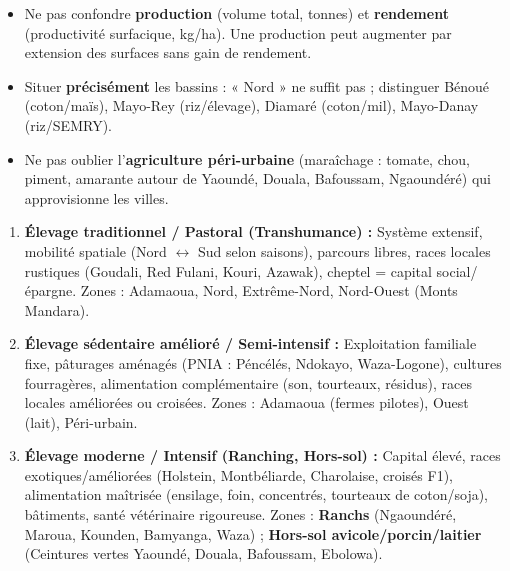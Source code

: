\documentclass[11pt]{article}
\newcounter{popsec}
\newcounter{popsub}
\newcommand{\courssub}[1]{%
  \stepcounter{popsub}%
  \par\vspace{9pt}\noindent{\popxbold\fontsize{11.5}{13}\selectfont\color{popink}{\color{poporange}\thepopsec.\thepopsub}\hspace{6pt}#1}\par\nopagebreak\vspace{4pt}
}
\begin{document}
\begin{attention}
\begin{itemize}
    \item Ne pas confondre \textbf{production} (volume total, tonnes) et \textbf{rendement} (productivité surfacique, kg/ha). Une production peut augmenter par extension des surfaces sans gain de rendement.
    \item Situer \textbf{précisément} les bassins : « Nord » ne suffit pas ; distinguer Bénoué (coton/maïs), Mayo-Rey (riz/élevage), Diamaré (coton/mil), Mayo-Danay (riz/SEMRY).
    \item Ne pas oublier l'\textbf{agriculture péri-urbaine} (maraîchage : tomate, chou, piment, amarante autour de Yaoundé, Douala, Bafoussam, Ngaoundéré) qui approvisionne les villes.
\end{itemize}
\end{attention}

\courssub{L'élevage au Cameroun}

\begin{definition}
\begin{enumerate}
    \item \textbf{Élevage traditionnel / Pastoral (Transhumance) :} Système extensif, mobilité spatiale (Nord $\leftrightarrow$ Sud selon saisons), parcours libres, races locales rustiques (Goudali, Red Fulani, Kouri, Azawak), cheptel = capital social/épargne. Zones : Adamaoua, Nord, Extrême-Nord, Nord-Ouest (Monts Mandara).
    \item \textbf{Élevage sédentaire amélioré / Semi-intensif :} Exploitation familiale fixe, pâturages aménagés (PNIA : Péncélés, Ndokayo, Waza-Logone), cultures fourragères, alimentation complémentaire (son, tourteaux, résidus), races locales améliorées ou croisées. Zones : Adamaoua (fermes pilotes), Ouest (lait), Péri-urbain.
    \item \textbf{Élevage moderne / Intensif (Ranching, Hors-sol) :} Capital élevé, races exotiques/améliorées (Holstein, Montbéliarde, Charolaise, croisés F1), alimentation maîtrisée (ensilage, foin, concentrés, tourteaux de coton/soja), bâtiments, santé vétérinaire rigoureuse. Zones : \textbf{Ranchs} (Ngaoundéré, Maroua, Kounden, Bamyanga, Waza) ; \textbf{Hors-sol avicole/porcin/laitier} (Ceintures vertes Yaoundé, Douala, Bafoussam, Ebolowa).
\end{enumerate}
\end{definition}
\end{document}
